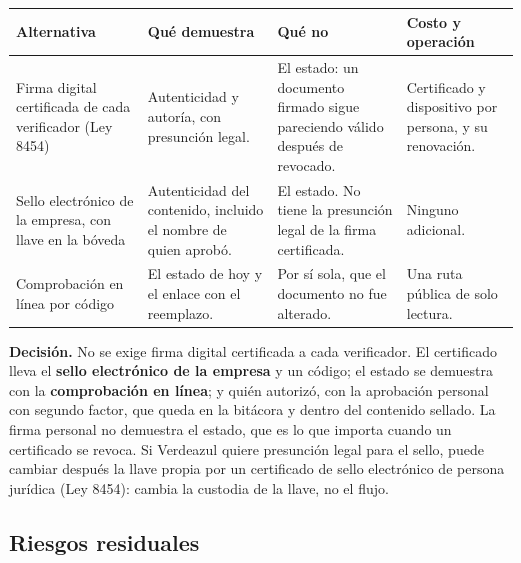 \documentclass[11pt,letterpaper]{article}
\newcommand{\cab}[1]{\textbf{\rmfamily #1}}
\begin{document}
\begin{center}
\small
\renewcommand{\arraystretch}{1.14}
\begin{tabularx}{\textwidth}{@{}L{3.6cm} L{4.0cm} Y L{3.5cm}@{}}
\toprule
\cab{Alternativa} & \cab{Qué demuestra} & \cab{Qué no} & \cab{Costo y operación} \\
\midrule
Firma digital certificada de cada verificador (Ley 8454) & Autenticidad y autoría, con presunción legal. & El estado: un documento firmado sigue pareciendo válido después de revocado. & Certificado y dispositivo por persona, y su renovación. \\
Sello electrónico de la empresa, con llave en la bóveda & Autenticidad del contenido, incluido el nombre de quien aprobó. & El estado. No tiene la presunción legal de la firma certificada. & Ninguno adicional. \\
Comprobación en línea por código & El estado de hoy y el enlace con el reemplazo. & Por sí sola, que el documento no fue alterado. & Una ruta pública de solo lectura. \\
\bottomrule
\end{tabularx}
\end{center}

\begin{decision}
\textbf{Decisión.} No se exige firma digital certificada a cada verificador. El certificado lleva el
\textbf{sello electrónico de la empresa} y un código; el estado se demuestra con la \textbf{comprobación
en línea}; y quién autorizó, con la aprobación personal con segundo factor, que queda en la bitácora
y dentro del contenido sellado. La firma personal no demuestra el estado, que es lo que importa
cuando un certificado se revoca. Si Verdeazul quiere presunción legal para el sello, puede cambiar
después la llave propia por un certificado de sello electrónico de persona jurídica (Ley 8454):
cambia la custodia de la llave, no el flujo.
\end{decision}

\subsection{Riesgos residuales}
\end{document}
